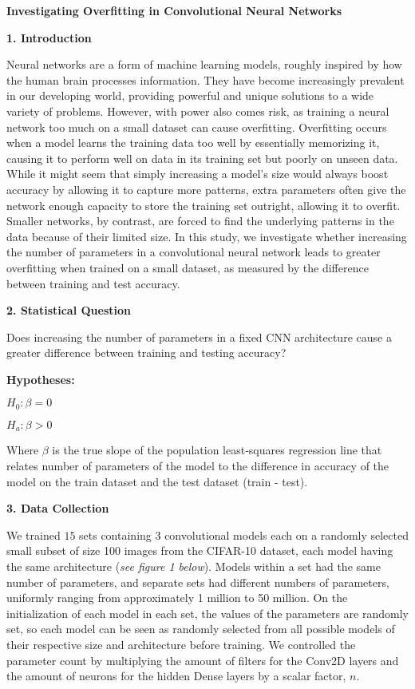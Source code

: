 \documentclass[12pt]{article}
\begin{document}
    \centerline{\textbf{Investigating Overfitting in Convolutional Neural Networks}}

    \noindent\textbf{1. Introduction}

    Neural networks are a form of machine learning models, roughly inspired by how the human brain
    processes information. They have become increasingly prevalent in our developing world, providing
    powerful and unique solutions to a wide variety of problems. However, with power also comes risk,
    as training a neural network too much on a small dataset can cause overfitting. Overfitting occurs
    when a model learns the training data too well by essentially memorizing it, causing it to perform
    well on data in its training set but poorly on unseen data. While it might seem that simply
    increasing a model’s size would always boost accuracy by allowing it to capture more patterns,
    extra parameters often give the network enough capacity to store the training set outright, allowing
    it to overfit. Smaller networks, by contrast, are forced to find the underlying patterns in the data
    because of their limited size. In this study, we investigate whether increasing the number of parameters
    in a convolutional neural network leads to greater overfitting when trained on a small dataset, as
    measured by the difference between training and test accuracy.

    \noindent\textbf{2. Statistical Question}

    Does increasing the number of parameters in a fixed CNN architecture cause a greater difference
    between training and testing accuracy?

    \noindent\textbf{Hypotheses:}\newline
    \centerline{$H_0: \beta = 0$} \newline
    \centerline{$H_a: \beta > 0$} \newline
    Where $\beta$ is the true slope of the population least‐squares regression line that relates number
    of parameters of the model to the difference in accuracy of the model on the train dataset and the
    test dataset (train - test).

    \noindent\textbf{3. Data Collection}

    We trained $15$ sets containing $3$ convolutional models each on a randomly selected small subset of size 100 images
    from the CIFAR-10 dataset, each model having the same architecture (\textit{see figure 1 below}).
    Models within a set had the same number of parameters, and separate sets had different numbers of parameters,
    uniformly ranging from approximately 1 million to 50 million.
    On the initialization of each model in each set, the values of the parameters are randomly set, so each model can be seen as randomly
    selected from all possible models of their respective size and architecture before training.
    We controlled the parameter count by multiplying the amount of filters for the Conv2D layers and the amount of neurons
    for the hidden Dense layers by a scalar factor, $n$.
\end{document}
